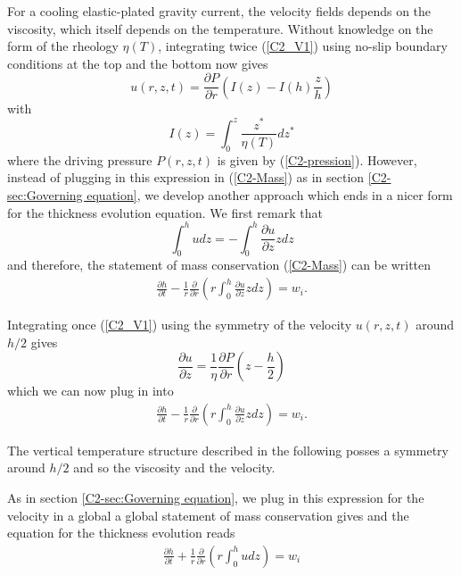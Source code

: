 For  a cooling  elastic-plated  gravity current,  the velocity  fields
depends   on   the   viscosity,    which   itself   depends   on   the
temperature. Without knowledge on the  form of the rheology $\eta(T)$,
integrating twice  (\ref{C2_V1}) using no-slip boundary  conditions at
the top and the bottom now gives
\begin{equation}
  u(r,z,t) = \frac{\partial P}{\partial r}\left(I(z)-I(h)\frac{z}{h}\right)
\end{equation}
with
\begin{equation}
  I(z) = \int_0^z\frac{z^*}{\eta(T)}dz^*
\end{equation}
where the driving pressure $P(r,z,t)$ is given by (\ref{C2-pression}).
However, instead of plugging in  this expression in (\ref{C2-Mass}) as
in  section   \ref{C2-sec:Governing  equation},  we   develop  another
approach  which ends  in  a  nicer form  for  the thickness  evolution
equation. We first remark that
\begin{equation}
  \int_0^h u dz = -\int_0^h\frac{\partial u}{\partial z}zdz
\end{equation}
and therefore, the statement  of mass conservation (\ref{C2-Mass}) can
be written
\begin{eqnarray}
  \frac{\partial         h}{\partial        t} -\frac{1}{r}
  \frac{\partial}{\partial
  r} \left( r\int_0^h\frac{\partial u}{\partial z}zdz\right) = w_i.
  \label{C3-Mass}
\end{eqnarray}



Integrating  once (\ref{C2_V1})  using  the symmetry  of the  velocity
$u(r,z,t)$ around $h/2$ gives
\begin{equation}
  \frac{\partial u}{\partial z} = \frac{1}{\eta}\frac{\partial P}{\partial r}\left(z-\frac{h}{2}\right)
\end{equation}
which we can now plug in into 
\begin{eqnarray}
  \frac{\partial         h}{\partial        t} -\frac{1}{r}
  \frac{\partial}{\partial
  r} \left( r\int_0^h\frac{\partial u}{\partial z}zdz\right) = w_i.
  \label{C3-Mass}
\end{eqnarray}


The vertical temperature structure described in the following posses a
symmetry around $h/2$ and so the viscosity and the velocity.



As  in  section  \ref{C2-sec:Governing  equation},  we  plug  in  this
expression for  the velocity in  a global  a global statement  of mass
conservation gives and the equation for the thickness evolution reads
\begin{eqnarray}
  \frac{\partial         h}{\partial        t} +\frac{1}{r}
  \frac{\partial}{\partial
  r} \left( r\int_0^hudz\right) = w_i
  \label{C2-Mass}
\end{eqnarray}

